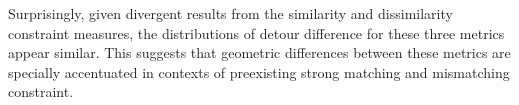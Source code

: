 Surprisingly, given divergent results from the similarity and dissimilarity constraint measures, the distributions of detour difference for these three metrics appear similar.
This suggests that geometric differences between these metrics are specially accentuated in contexts of preexisting strong matching and mismatching constraint.
